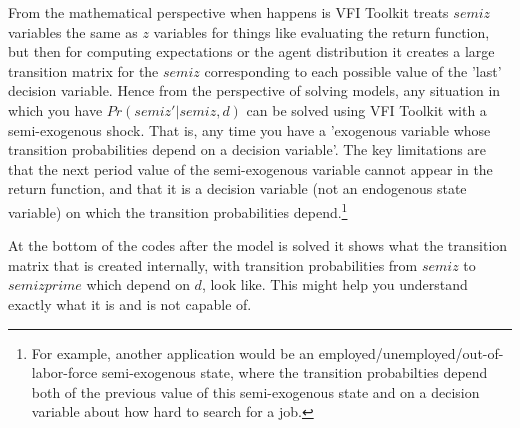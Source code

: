 From the mathematical perspective when happens is VFI Toolkit treats $semiz$ variables the same as $z$ variables for things like evaluating the return function, but then for computing expectations or the agent distribution it creates a large transition matrix for the $semiz$ corresponding to each possible value of the 'last' decision variable. Hence from the perspective of solving models, any situation in which you have $Pr(semiz'|semiz,d)$ can be solved using VFI Toolkit with a semi-exogenous shock. That is, any time you have a 'exogenous variable whose transition probabilities depend on a decision variable'. The key limitations are that the next period value of the semi-exogenous variable cannot appear in the return function, and that it is a decision variable (not an endogenous state variable) on which the transition probabilities depend.\footnote{For example, another application would be an employed/unemployed/out-of-labor-force semi-exogenous state, where the transition probabilties depend both of the previous value of this semi-exogenous state and on a decision variable about how hard to search for a job.}

At the bottom of the codes after the model is solved it shows what the transition matrix that is created internally, with transition probabilities from $semiz$ to $semizprime$ which depend on $d$, look like. This might help you understand exactly what it is and is not capable of.
